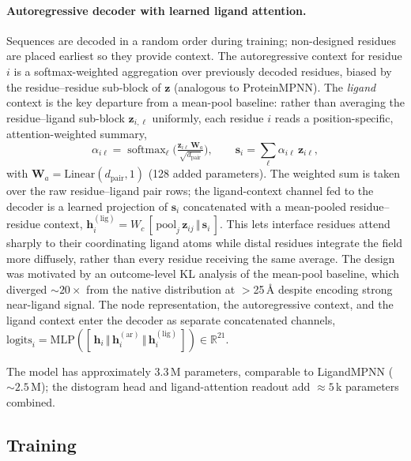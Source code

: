 \documentclass[11pt,letterpaper]{article}
\newcommand{\R}{\mathbb{R}}
\newcommand{\bz}{\mathbf{z}}
\newcommand{\bh}{\mathbf{h}}
\newcommand{\bW}{\mathbf{W}}
\DeclareMathOperator*{\softmax}{softmax}
\begin{document}
\paragraph{Autoregressive decoder with learned ligand attention.}
Sequences are decoded in a random order during training; non-designed residues are placed earliest so
they provide context. The autoregressive context for residue $i$ is a softmax-weighted aggregation
over previously decoded residues, biased by the residue--residue sub-block of $\bz$
(analogous to ProteinMPNN). The \emph{ligand} context is the key departure from a mean-pool
baseline: rather than averaging the residue--ligand sub-block $\bz_{i,\ell}$ uniformly, each residue
$i$ reads a position-specific, attention-weighted summary,
\begin{equation}
  \alpha_{i\ell} = \softmax_\ell\!\Big(\tfrac{\bz_{i\ell}\,\bW_a}{\sqrt{d_{\text{pair}}}}\Big),
  \qquad
  \mathbf{s}_i = \sum_{\ell} \alpha_{i\ell}\,\bz_{i\ell},
\end{equation}
with $\bW_a = \text{Linear}(d_{\text{pair}}, 1)$ (128 added parameters). The weighted sum is taken over
the raw residue--ligand pair rows; the ligand-context channel fed to the decoder is a learned
projection of $\mathbf{s}_i$ concatenated with a mean-pooled residue--residue context,
$\bh_i^{(\text{lig})} = W_c\,[\,\mathrm{pool}_j\,\bz_{ij}\,\Vert\,\mathbf{s}_i\,]$. This lets interface residues
attend sharply to their coordinating ligand atoms while distal residues integrate the field more
diffusely, rather than every residue receiving the same average. The design was motivated by an
outcome-level KL analysis of the mean-pool baseline, which diverged ${\sim}20{\times}$ from the native
distribution at $>$25\,{\AA} despite encoding strong near-ligand signal. The node representation, the
autoregressive context, and the ligand context enter the decoder as separate concatenated channels,
$\text{logits}_i = \text{MLP}([\,\bh_i \,\Vert\, \bh_i^{(\text{ar})} \,\Vert\, \bh_i^{(\text{lig})}\,]) \in \R^{21}$.

The model has approximately 3.3\,M parameters, comparable to LigandMPNN (${\sim}2.5$\,M); the
distogram head and ligand-attention readout add ${\approx}5$\,k parameters combined.

\subsection{Training}
\label{sec:training}
\end{document}
